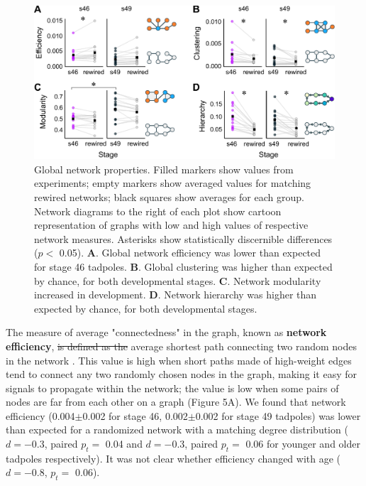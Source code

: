 \documentclass{article}
\providecommand{\DIFaddtex}[1]{{\protect\color{blue}{#1}}} %
\providecommand{\DIFdeltex}[1]{{\protect\color{red}\sout{#1}}}                      %
\providecommand{\DIFaddbegin}{} %
\providecommand{\DIFaddend}{} %
\providecommand{\DIFdelbegin}{} %
\providecommand{\DIFdelend}{} %
\providecommand{\DIFadd}[1]{\texorpdfstring{\DIFaddtex{#1}}{#1}} %
\providecommand{\DIFdel}[1]{\texorpdfstring{\DIFdeltex{#1}}{}} %
\newcommand{\DIFscaledelfig}{0.5}
\newlength{\DIFdelgraphicswidth} %
\newlength{\DIFdelgraphicsheight} %
\newcommand{\DIFaddincludegraphics}[2][]{{\color{blue}\fbox{\DIFOincludegraphics[#1]{#2}}}} %
\newcommand{\DIFdelincludegraphics}[2][]{%
\sbox{\DIFdelgraphicsbox}{\DIFOincludegraphics[#1]{#2}}%
\settoboxwidth{\DIFdelgraphicswidth}{\DIFdelgraphicsbox} %
\settoboxtotalheight{\DIFdelgraphicsheight}{\DIFdelgraphicsbox} %
\scalebox{\DIFscaledelfig}{%
\parbox[b]{\DIFdelgraphicswidth}{\usebox{\DIFdelgraphicsbox}\\[-\baselineskip] \rule{\DIFdelgraphicswidth}{0em}}\llap{\resizebox{\DIFdelgraphicswidth}{\DIFdelgraphicsheight}{%
\setlength{\unitlength}{\DIFdelgraphicswidth}%
\begin{picture}(1,1)%
\thicklines\linethickness{2pt} %
{\color[rgb]{1,0,0}\put(0,0){\framebox(1,1){}}}%
{\color[rgb]{1,0,0}\put(0,0){\line( 1,1){1}}}%
{\color[rgb]{1,0,0}\put(0,1){\line(1,-1){1}}}%
\end{picture}%
}\hspace*{3pt}}} %
} %
\DeclareRobustCommand{\DIFaddbegin}{\DIFOaddbegin \let\includegraphics\DIFaddincludegraphics} %
\DeclareRobustCommand{\DIFaddend}{\DIFOaddend \let\includegraphics\DIFOincludegraphics} %
\DeclareRobustCommand{\DIFdelbegin}{\DIFOdelbegin \let\includegraphics\DIFdelincludegraphics} %
\DeclareRobustCommand{\DIFdelend}{\DIFOaddend \let\includegraphics\DIFOincludegraphics} %
\begin{document}
\begin{figure}[t!]
\includegraphics[width=\linewidth]{fig5.pdf}
\caption{
Global network properties. Filled markers show values from experiments; empty markers show averaged values for matching rewired networks; black squares show averages for each group. Network diagrams to the right of each plot show cartoon representation of graphs with low and high values of respective network measures. Asterisks show statistically discernible differences ($p<$ 0.05). \textbf{A}. Global network efficiency was lower than expected for stage 46 tadpoles. \textbf{B}. Global clustering was higher than expected by chance, for both developmental stages. \textbf{C}. Network modularity increased in development.  \textbf{D}. Network hierarchy was higher than expected by chance, for both developmental stages. }
\end{figure}

The measure of average "connectedness" in the graph, known as \textbf{network efficiency}, \DIFdelbegin \DIFdel{is defined as the }\DIFdelend \DIFaddbegin \DIFadd{quantifies the length of the }\DIFaddend average shortest path connecting two random nodes in the network \citep{latora2001efficiency, rubinov2010toolbox}. This value is high when short paths made of high-weight edges tend to connect any two randomly chosen nodes in the graph, making it easy for signals to propagate within the network; the value is low when some pairs of nodes are far from each other on a graph (Figure 5A). We found that network efficiency (0.004$\pm$0.002 for stage 46, 0.002$\pm$0.002 for stage 49 tadpoles) was lower than expected for a randomized network with a matching degree distribution ($d=-$0.3, paired $p_t=$ 0.04 and $d=-$0.3, paired $p_t=$ 0.06 for younger and older tadpoles respectively). It was not clear whether efficiency changed with age ($d=-$0.8, $p_t=$ 0.06).
\end{document}
